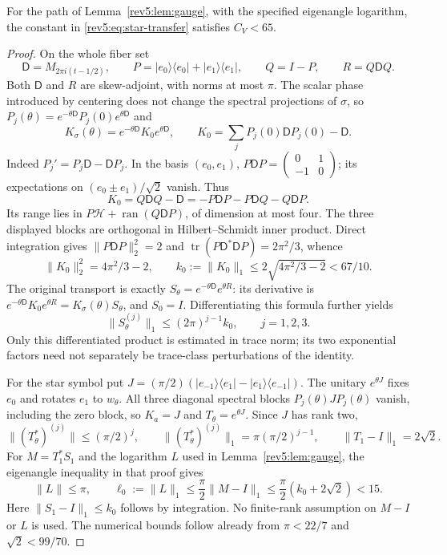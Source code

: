 \begin{lemma}
\label{pubpair:lem:numerical-gauge}
For the path of Lemma~\ref{rev5:lem:gauge}, with the specified
eigenangle logarithm, the constant in
\eqref{rev5:eq:star-transfer} satisfies $C_V<65$.
\end{lemma}
\begin{proof}
On the whole fiber set
\[
 \mathsf D=M_{2\pi i(t-1/2)},\qquad
 P=|e_0\rangle\langle e_0|+|e_1\rangle\langle e_1|,\qquad
 Q=I-P,\qquad R=Q\mathsf DQ.
\]
Both $\mathsf D$ and $R$ are skew-adjoint, with norms at most $\pi$.
The scalar phase introduced by centering does not change the
spectral projections of $\sigma$, so
$P_j(\theta)=e^{-\theta\mathsf D}P_j(0)e^{\theta\mathsf D}$ and
\[
 K_\sigma(\theta)=e^{-\theta\mathsf D}K_0e^{\theta\mathsf D},
 \qquad
 K_0=\sum_jP_j(0)\mathsf DP_j(0)-\mathsf D.
\]
Indeed $P_j'=P_j\mathsf D-\mathsf DP_j$.  In the basis $(e_0,e_1)$,
$P\mathsf DP=\left(\begin{smallmatrix}0&1\\-1&0\end{smallmatrix}\right)$;
its expectations on $(e_0\pm e_1)/\sqrt2$ vanish.  Thus
\[
 K_0=Q\mathsf DQ-\mathsf D
    =-P\mathsf DP-P\mathsf DQ-Q\mathsf DP.
\]
Its range lies in $P\mathscr H+\operatorname{ran}(Q\mathsf DP)$, of
dimension at most four.  The three displayed blocks are orthogonal
in Hilbert--Schmidt inner product.  Direct integration gives
$\|P\mathsf DP\|_2^2=2$ and
$\operatorname{tr}(P\mathsf D^*\mathsf DP)=2\pi^2/3$, whence
\[
 \|K_0\|_2^2=4\pi^2/3-2,\qquad
 k_0:=\|K_0\|_1\le2\sqrt{4\pi^2/3-2}<67/10.
\]
The original transport is exactly
$S_\theta=e^{-\theta\mathsf D}e^{\theta R}$: its derivative is
$e^{-\theta\mathsf D}K_0e^{\theta R}=K_\sigma(\theta)S_\theta$,
and $S_0=I$.  Differentiating this formula further yields
\[
 \|S_\theta^{(j)}\|_1\le(2\pi)^{j-1}k_0,\qquad j=1,2,3.
\]
Only this differentiated product is estimated in trace norm; its
two exponential factors need not separately be trace-class
perturbations of the identity.

For the star symbol put
$J=(\pi/2)(|e_{-1}\rangle\langle e_1|
          -|e_1\rangle\langle e_{-1}|)$.
The unitary $e^{\theta J}$ fixes $e_0$ and rotates $e_1$ to $w_\theta$.
All three diagonal spectral blocks $P_j(\theta)JP_j(\theta)$
vanish, including the zero block, so $K_a=J$ and
$T_\theta=e^{\theta J}$.  Since $J$ has rank two,
\[
 \|(T_\theta^*)^{(j)}\|\le(\pi/2)^j,\qquad
 \|(T_\theta^*)^{(j)}\|_1=\pi(\pi/2)^{j-1},\qquad
 \|T_1-I\|_1=2\sqrt2.
\]
For $M=T_1^*S_1$ and the logarithm $L$ used in
Lemma~\ref{rev5:lem:gauge}, the eigenangle inequality in that proof
gives
\[
 \|L\|\le\pi,\qquad
 \ell_0:=\|L\|_1
 \le\frac{\pi}{2}\|M-I\|_1
 \le\frac{\pi}{2}(k_0+2\sqrt2)<15.
\]
Here $\|S_1-I\|_1\le k_0$ follows by integration.  No finite-rank
assumption on $M-I$ or $L$ is used.  The numerical bounds follow
already from $\pi<22/7$ and $\sqrt2<99/70$.


\end{proof}
